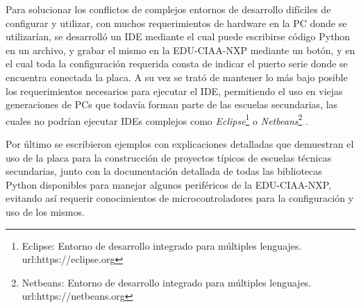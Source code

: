 Para solucionar los conflictos de complejos entornos de desarrollo difíciles de configurar y utilizar, con muchos requerimientos de hardware en la PC donde se utilizarían, se desarrolló un IDE mediante el cual puede escribirse código Python en un archivo, y grabar el mismo en la EDU-CIAA-NXP mediante un botón, y en el cual toda la configuración requerida consta de indicar el puerto serie donde se encuentra conectada la placa. A su vez se trató de mantener lo más bajo posible los requerimientos necesarios para ejecutar el IDE, permitiendo el uso en viejas generaciones de PCs que todavía forman parte de las escuelas secundarias, las cuales no podrían ejecutar IDEs complejos como \textit{Eclipse}\footnote{Eclipse: Entorno de desarrollo integrado para múltiples lenguajes. url:https://eclipse.org} o \textit{Netbeans}\footnote{Netbeans: Entorno de desarrollo integrado para múltiples lenguajes. url:https://netbeans.org} .

Por último se escribieron ejemplos con explicaciones detalladas que demuestran el uso de la placa para la construcción de proyectos típicos de escuelas técnicas secundarias, junto con la documentación detallada de todas las bibliotecas Python disponibles para manejar algunos periféricos de la EDU-CIAA-NXP, evitando así requerir conocimientos de microcontroladores para la configuración y uso de los mismos.







 



